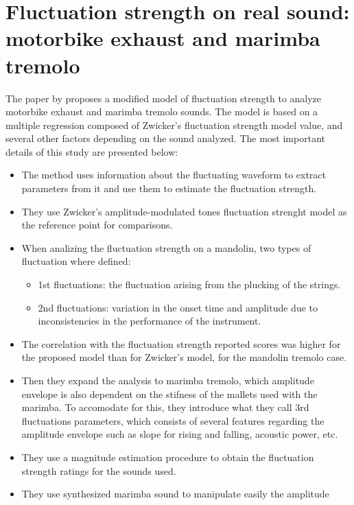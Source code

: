 \section{Fluctuation strength on real sound: motorbike exhaust and marimba
    tremolo}

The paper by \citeauthor{Miura2013Fluctuation} proposes a modified model of
fluctuation strength to analyze motorbike exhaust and marimba tremolo sounds.
The model is based on a multiple regression composed of Zwicker's fluctuation
strength model value, and several other factors depending on the sound
analyzed. The most important details of this study are presented below:

\begin{itemize}
    \item The method uses information about the fluctuating waveform to extract
        parameters from it and use them to estimate the fluctuation strength.
    \item They use Zwicker's amplitude-modulated tones fluctuation strenght
        model as the reference point for comparisons.
    \item When analizing the fluctuation strength on a mandolin, two types of
        fluctuation where defined:
        \begin{itemize}
            \item 1st fluctuations: the fluctuation arising from the plucking of
                the strings.
            \item 2nd fluctuations: variation in the onset time and amplitude
                due to inconsistencies in the performance of the instrument.
        \end{itemize}
    \item The correlation with the fluctuation strength reported scores was
        higher for the proposed model than for Zwicker's model, for the mandolin
        tremolo case.
    \item Then they expand the analysis to marimba tremolo, which amplitude
        envelope is also dependent on the stifness of the mallets used with the
        marimba. To accomodate for this, they introduce what they call 3rd
        fluctuations parameters, which consists of several features regarding
        the amplitude envelope such as slope for rising and falling, acoustic
        power, etc.
    \item They use a magnitude estimation procedure to obtain the fluctuation
        strength ratings for the sounds used.
    \item They use synthesized marimba sound to manipulate easily the amplitude

\end{itemize}
